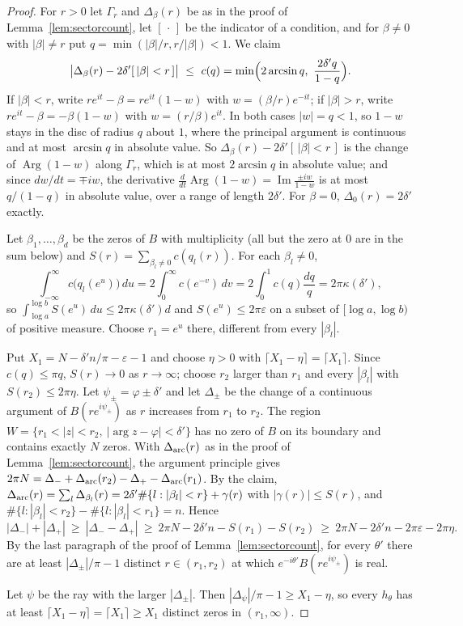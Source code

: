 \documentclass[11pt]{article}
\begin{document}
\begin{proof}
For $r>0$ let $\Gamma_r$ and $\Delta_\beta(r)$ be as in the proof of
Lemma~\ref{lem:sectorcount}, let $[\,\cdot\,]$ be the indicator of a
condition, and for $\beta\ne0$ with $|\beta|\ne r$ put
$q=\min(|\beta|/r,r/|\beta|)<1$.  We claim
\[
  \bigl|\Delta_\beta(r)-2\delta'[\,|\beta|<r\,]\bigr|\ \le\
  c(q)=\min\Bigl(2\arcsin q,\ \frac{2\delta'q}{1-q}\Bigr).
\]
If $|\beta|<r$, write $re^{it}-\beta=re^{it}(1-w)$ with
$w=(\beta/r)e^{-it}$; if $|\beta|>r$, write $re^{it}-\beta=-\beta(1-w)$ with
$w=(r/\beta)e^{it}$.  In both cases $|w|=q<1$, so $1-w$ stays in the disc of
radius $q$ about $1$, where the principal argument is continuous and at most
$\arcsin q$ in absolute value.  So $\Delta_\beta(r)-2\delta'[\,|\beta|<r\,]$
is the change of $\operatorname{Arg}(1-w)$ along $\Gamma_r$, which is at most
$2\arcsin q$ in absolute value; and since $dw/dt=\mp iw$, the derivative
$\frac{d}{dt}\operatorname{Arg}(1-w)=\operatorname{Im}\frac{\pm iw}{1-w}$ is at most $q/(1-q)$ in
absolute value, over a range of length $2\delta'$.  For $\beta=0$,
$\Delta_0(r)=2\delta'$ exactly.

Let $\beta_1,\ldots,\beta_d$ be the zeros of $B$ with multiplicity (all but
the zero at $0$ are in the sum below) and
$S(r)=\sum_{\beta_l\ne0}c(q_l(r))$.  For each $\beta_l\ne0$,
\[
  \int_{-\infty}^{\infty}c\bigl(q_l(e^u)\bigr)\,du
  =2\int_0^\infty c(e^{-v})\,dv=2\int_0^1c(q)\frac{dq}q=2\pi\kappa(\delta'),
\]
so $\int_{\log a}^{\log b}S(e^u)\,du\le2\pi\kappa(\delta')d$ and
$S(e^u)\le2\pi\varepsilon$ on a subset of $[\log a,\log b)$ of positive
measure.  Choose $r_1=e^u$ there, different from every $|\beta_l|$.

Put $X_1=N-\delta'n/\pi-\varepsilon-1$ and choose $\eta>0$
with $\lceil X_1-\eta\rceil=\lceil X_1\rceil$.  Since $c(q)\le\pi q$, $S(r)\to0$ as
$r\to\infty$; choose $r_2$ larger than $r_1$ and every $|\beta_l|$ with
$S(r_2)\le2\pi\eta$.  Let $\psi_\pm=\varphi\pm\delta'$ and let $\Delta_\pm$ be
the change of a continuous argument of $B(re^{i\psi_\pm})$ as $r$ increases
from $r_1$ to $r_2$.  The region
$W=\{r_1<|z|<r_2,\ |\arg z-\varphi|<\delta'\}$ has no zero of $B$ on its
boundary and contains exactly $N$ zeros.  With $\Delta_{\rm arc}(r)$ as in
the proof of Lemma~\ref{lem:sectorcount}, the argument principle gives
$2\pi N=\Delta_-+\Delta_{\rm arc}(r_2)-\Delta_+-\Delta_{\rm arc}(r_1)$.  By
the claim,
$\Delta_{\rm arc}(r)=\sum_l\Delta_{\beta_l}(r)=2\delta'\#\{l:|\beta_l|<r\}+\gamma(r)$
with $|\gamma(r)|\le S(r)$, and
$\#\{l:|\beta_l|<r_2\}-\#\{l:|\beta_l|<r_1\}=n$.  Hence
\[
  |\Delta_-|+|\Delta_+|\ \ge\ |\Delta_--\Delta_+|
  \ \ge\ 2\pi N-2\delta'n-S(r_1)-S(r_2)
  \ \ge\ 2\pi N-2\delta'n-2\pi\varepsilon-2\pi\eta .
\]
By the last paragraph of the proof of Lemma~\ref{lem:sectorcount}, for every
$\theta'$ there are at least $|\Delta_\pm|/\pi-1$ distinct
$r\in(r_1,r_2)$ at which $e^{-i\theta'}B(re^{i\psi_\pm})$ is real.

Let $\psi$ be the ray with the larger $|\Delta_\pm|$.  Then
$|\Delta_\psi|/\pi-1\ge X_1-\eta$, so every $h_\theta$ has at least
$\lceil X_1-\eta\rceil=\lceil X_1\rceil\ge X_1$ distinct zeros in
$(r_1,\infty)$.
\end{proof}
\end{document}
